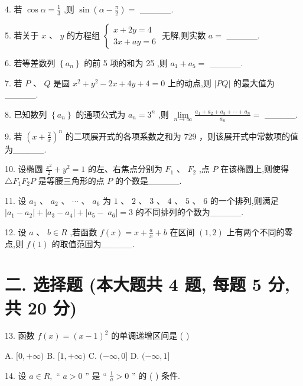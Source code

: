 \documentclass[10pt]{article}
\begin{document}
4. 若 \(\cos \alpha  = \frac{1}{3}\) ,则 \(\sin \left( {\alpha  - \frac{\pi }{2}}\right)  =\) \_\_\_\_\_.

5. 若关于 \(x\text{ 、 }y\) 的方程组 \(\left\{  \begin{array}{l} x + {2y} = 4 \\  {3x} + {ay} = 6 \end{array}\right.\) 无解,则实数 \(a =\) \_\_\_\_\_.

6. 若等差数列 \(\left\{  {a}_{n}\right\}\) 的前 5 项的和为 25 ,则 \({a}_{1} + {a}_{5} =\) \_\_\_\_\_.

7. 若 \(P\text{ 、 }Q\) 是圆 \({x}^{2} + {y}^{2} - {2x} + {4y} + 4 = 0\) 上的动点,则 \(\left| {PQ}\right|\) 的最大值为\_\_\_\_\_.

8. 已知数列 \(\left\{  {a}_{n}\right\}\) 的通项公式为 \({a}_{n} = {3}^{n}\) ,则 \(\mathop{\lim }\limits_{{n \rightarrow  \infty }}\frac{{a}_{1} + {a}_{2} + {a}_{3} + \cdots  + {a}_{n}}{{a}_{n}} =\) \_\_\_\_\_.

9. 若 \({\left( x + \frac{2}{x}\right) }^{n}\) 的二项展开式的各项系数之和为 729 ，则该展开式中常数项的值为\_\_\_\_\_.

10. 设椭圆 \(\frac{{x}^{2}}{2} + {y}^{2} = 1\) 的左、右焦点分别为 \({F}_{1}\text{ 、 }{F}_{2}\) ,点 \(P\) 在该椭圆上,则使得 \(\bigtriangleup {F}_{1}{F}_{2}P\) 是等腰三角形的点 \(P\) 的个数是\_\_\_\_\_.

11. 设 \({a}_{1}\text{ 、 }{a}_{2}\text{ 、 }\cdots \text{ 、 }{a}_{6}\) 为 \(1\text{ 、 }2\text{ 、 }3\text{ 、 }4\text{ 、 }5\text{ 、 }6\) 的一个排列,则满足 \(\left| {{a}_{1} - {a}_{2}}\right|  + \left| {{a}_{3} - {a}_{4}}\right|  +  \mid  {a}_{5} - \; {a}_{6} \mid   = 3\) 的不同排列的个数为\_\_\_\_\_.

12. 设 \(a\text{ 、 }b \in  R\) ,若函数 \(f\left( x\right)  = x + \frac{a}{x} + b\) 在区间 \(\left( {1,2}\right)\) 上有两个不同的零点,则 \(f\left( 1\right)\) 的取值范围为\_\_\_\_\_.

\section*{二. 选择题 (本大题共 4 题, 每题 5 分, 共 20 分)}

13. 函数 \(f\left( x\right)  = {\left( x - 1\right) }^{2}\) 的单调递增区间是 ( )

A. \(\lbrack 0, + \infty )\) B. \(\lbrack 1, + \infty )\) C. \(( - \infty ,0\rbrack\) D. \(( - \infty ,1\rbrack\)

14. 设 \(a \in  R,\) “ \(a > 0\) ” 是 “ \(\frac{1}{a} > 0\) ” 的 ( ) 条件.
\end{document}
